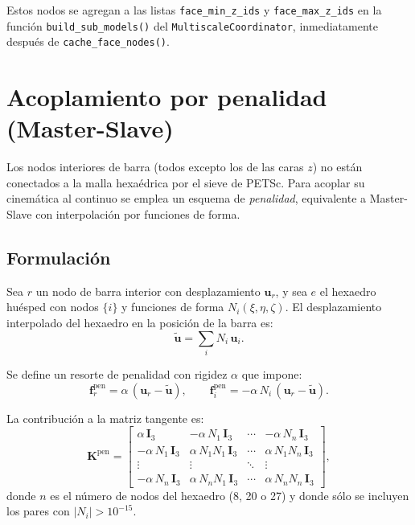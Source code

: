 Estos nodos se agregan a las listas \texttt{face\_min\_z\_ids} y
\texttt{face\_max\_z\_ids} en la función
\texttt{build\_sub\_models()} del \texttt{MultiscaleCoordinator},
inmediatamente después de \texttt{cache\_face\_nodes()}.


\section{Acoplamiento por penalidad (Master-Slave)}
\label{sec:emb-penalty}

Los nodos interiores de barra (todos excepto los de las caras $z$)
no están conectados a la malla hexaédrica por el sieve de PETSc.
Para acoplar su cinemática al continuo se emplea un esquema de
\emph{penalidad}, equivalente a Master-Slave con interpolación por
funciones de forma.

\subsection{Formulación}

Sea $r$ un nodo de barra interior con desplazamiento $\mathbf{u}_r$, y
sea $e$ el hexaedro huésped con nodos $\{i\}$ y funciones de forma
$N_i(\xi, \eta, \zeta)$.  El desplazamiento interpolado del hexaedro
en la posición de la barra es:
%
\begin{equation}
  \tilde{\mathbf{u}} = \sum_i N_i\,\mathbf{u}_i.
\end{equation}

Se define un resorte de penalidad con rigidez $\alpha$ que impone:
%
\begin{equation}
  \mathbf{f}_r^{\text{pen}} =
    \alpha\,(\mathbf{u}_r - \tilde{\mathbf{u}}),
  \qquad
  \mathbf{f}_i^{\text{pen}} =
    -\alpha\,N_i\,(\mathbf{u}_r - \tilde{\mathbf{u}}).
\end{equation}

La contribución a la matriz tangente es:
%
\begin{equation}
  \mathbf{K}^{\text{pen}} =
  \begin{bmatrix}
    \alpha\,\mathbf{I}_3 & -\alpha\,N_1\,\mathbf{I}_3 &
      \cdots & -\alpha\,N_n\,\mathbf{I}_3 \\[4pt]
    -\alpha\,N_1\,\mathbf{I}_3 &
      \alpha\,N_1 N_1\,\mathbf{I}_3 & \cdots &
      \alpha\,N_1 N_n\,\mathbf{I}_3 \\
    \vdots & \vdots & \ddots & \vdots \\
    -\alpha\,N_n\,\mathbf{I}_3 &
      \alpha\,N_n N_1\,\mathbf{I}_3 & \cdots &
      \alpha\,N_n N_n\,\mathbf{I}_3
  \end{bmatrix},
  \label{eq:penalty-stiffness}
\end{equation}
%
donde $n$ es el número de nodos del hexaedro (8, 20 o 27) y donde
sólo se incluyen los pares con $|N_i| > 10^{-15}$.

